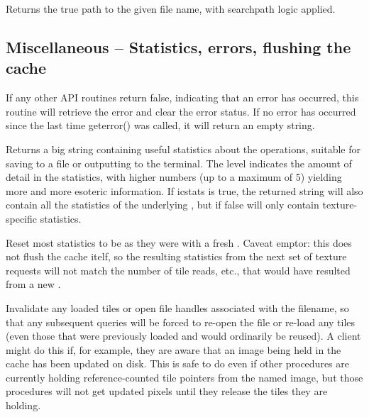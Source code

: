 \apiend

Returns the true path to the given file name, with searchpath logic
applied.
\apiend

\subsection{Miscellaneous -- Statistics, errors, flushing the cache}
\label{sec:texturesys:api:geterror}
\label{sec:texturesys:api:getstats}
\label{sec:texturesys:api:resetstats}
\label{sec:texturesys:api:invalidate}

If any other API routines return {\cf false}, indicating that an
error has occurred, this routine will retrieve the error and clear
the error status.  If no error has occurred since the last time
{\cf geterror()} was called, it will return an empty string.
\apiend

Returns a big string containing useful statistics about the \ImageCache
operations, suitable for saving to a file or outputting to the terminal.
The {\cf level} indicates the amount of detail in the statistics,
with higher numbers (up to a maximum of 5) yielding more and more
esoteric information.  If {\cf icstats} is true, the returned string
will also contain all the statistics of the underlying \ImageCache,
but if false will only contain texture-specific statistics.
\apiend

Reset most statistics to be as they were with a fresh
\ImageCache.  Caveat emptor: this does not flush the cache
itelf, so the resulting statistics from the next set of texture
requests will not match the number of tile reads, etc., that
would have resulted from a new \ImageCache.
\apiend

Invalidate any loaded tiles or open file handles associated with
the filename, so that any subsequent queries will be forced to
re-open the file or re-load any tiles (even those that were
previously loaded and would ordinarily be reused).  A client
might do this if, for example, they are aware that an image
being held in the cache has been updated on disk.  This is safe
to do even if other procedures are currently holding 
reference-counted tile pointers from the named image, but those 
procedures will not get updated pixels until they release the 
tiles they are holding.
\apiend


